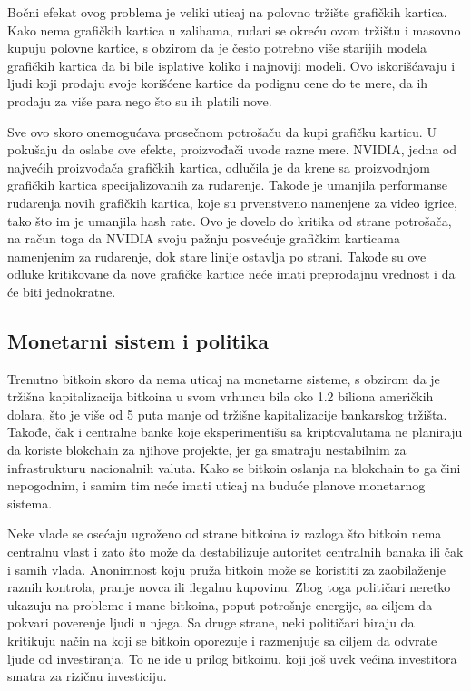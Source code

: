 \documentclass[a4paper]{article}
\begin{document}
Bočni efekat ovog problema je veliki uticaj na polovno tržište grafičkih kartica. Kako nema grafičkih kartica u zalihama, rudari se okreću ovom tržištu i masovno kupuju polovne kartice, s obzirom da je često potrebno više starijih modela grafičkih kartica da bi bile isplative koliko i najnoviji modeli. Ovo iskorišćavaju i ljudi koji prodaju svoje korišćene kartice da podignu cene do te mere, da ih prodaju za više para nego što su ih platili nove.

Sve ovo skoro onemogućava prosečnom potrošaču da kupi grafičku karticu. U pokušaju da oslabe ove efekte, proizvođači uvode razne mere. NVIDIA, jedna od najvećih proizvođača grafičkih kartica, odlučila je da krene sa proizvodnjom grafičkih kartica specijalizovanih za rudarenje. Takođe je umanjila performanse rudarenja novih grafičkih kartica, koje su prvenstveno namenjene za video igrice, tako što im je umanjila hash rate. Ovo je dovelo do kritika od strane potrošača, na račun toga da NVIDIA svoju pažnju posvećuje grafičkim karticama namenjenim za rudarenje, dok stare linije ostavlja po strani. Takođe su ove odluke kritikovane da nove grafičke kartice neće imati preprodajnu vrednost i da će biti jednokratne.

\subsection{Monetarni sistem i politika}

Trenutno bitkoin skoro da nema uticaj na monetarne sisteme, s obzirom da je tržišna kapitalizacija bitkoina u svom vrhuncu bila oko 1.2 biliona američkih dolara, što je više od 5 puta manje od tržišne kapitalizacije bankarskog tržišta. Takođe, čak i centralne banke koje eksperimentišu sa kriptovalutama ne planiraju da koriste blokchain za njihove projekte, jer ga smatraju nestabilnim za infrastrukturu nacionalnih valuta. Kako se bitkoin oslanja na blokchain to ga čini nepogodnim, i samim tim neće imati uticaj na buduće planove monetarnog sistema.

Neke vlade se osećaju ugroženo od strane bitkoina iz razloga što bitkoin nema centralnu vlast i zato što može da destabilizuje autoritet centralnih banaka ili čak i samih vlada. Anonimnost koju pruža bitkoin može se koristiti za zaobilaženje raznih kontrola, pranje novca ili ilegalnu kupovinu. Zbog toga političari neretko ukazuju na probleme i mane bitkoina, poput potrošnje energije, sa ciljem da pokvari poverenje ljudi u njega. Sa druge strane, neki političari biraju da kritikuju način na koji se bitkoin oporezuje i razmenjuje sa ciljem da odvrate ljude od investiranja. To ne ide u prilog bitkoinu, koji još uvek većina investitora smatra za rizičnu investiciju.
\end{document}
